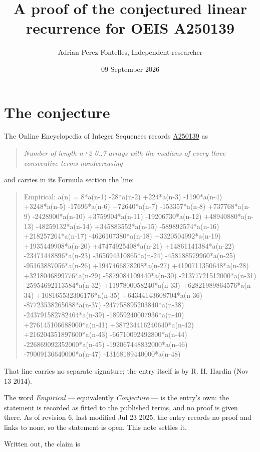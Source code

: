 \documentclass[11pt]{article}
\title{A proof of the conjectured linear recurrence for OEIS A250139}
\author{Adrian Perez Fontelles, Independent researcher}
\date{09 September 2026}
\theoremstyle{definition}
\begin{document}
\maketitle
\section{The conjecture}

The Online Encyclopedia of Integer Sequences records \href{https://oeis.org/A250139}{A250139} as

\begin{quote}\itshape Number of length n+2 0..7 arrays with the medians of every three consecutive terms nondecreasing\end{quote}

and carries in its Formula section the line:

\begin{quote}\ttfamily Empirical: a(n) = 8*a(n-1) -28*a(n-2) +224*a(n-3) -1190*a(n-4) +3248*a(n-5) -17696*a(n-6) +72640*a(n-7) -153357*a(n-8) +737768*a(n-9) -2428900*a(n-10) +3759904*a(n-11) -19206730*a(n-12) +48940880*a(n-13) -48259132*a(n-14) +345883552*a(n-15) -589892574*a(n-16) +218257264*a(n-17) -4626107380*a(n-18) +3320504992*a(n-19) +1935449908*a(n-20) +47474925408*a(n-21) +14861141384*a(n-22) -23471448896*a(n-23) -365694310865*a(n-24) -458188579960*a(n-25) -95163887056*a(n-26) +1947466878208*a(n-27) +4190711350648*a(n-28) +3218046899776*a(n-29) -5879084109440*a(n-30) -21377721512000*a(n-31) -25954692113584*a(n-32) +1197800058240*a(n-33) +62821989864576*a(n-34) +108165532306176*a(n-35) +64344143608704*a(n-36) -87723538265088*a(n-37) -247758895203840*a(n-38) -243791582782464*a(n-39) -18959240007936*a(n-40) +276145106688000*a(n-41) +387234416240640*a(n-42) +216204351897600*a(n-43) -66710092492800*a(n-44) -226869092352000*a(n-45) -192067448832000*a(n-46) -79009136640000*a(n-47) -13168189440000*a(n-48)\end{quote}

That line carries no separate signature; the entry itself is by R. H. Hardin (Nov 13 2014).

The word {\itshape Empirical} --- equivalently {\itshape Conjecture} --- is the entry's own: the statement is recorded as fitted to the published terms, and no proof is given there. As of revision 6, last modified Jul 23 2025, the entry records no proof and links to none, so the statement is open. This note settles it.

Written out, the claim is
\end{document}
